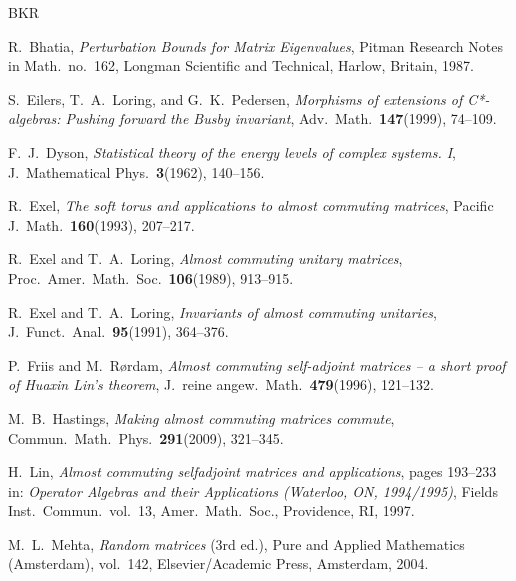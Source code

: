 \documentclass[10pt]{amsart}
\theoremstyle{definition}
\begin{document}
\begin{thebibliography}{BKR}

 R.~Bhatia,
{\emph{Perturbation Bounds for Matrix Eigenvalues}},
Pitman Research Notes in Math.\  no.~162,
Longman Scientific and Technical, Harlow, Britain, 1987.

S.~Eilers, T.~A.\  Loring, and G.~K.\  Pedersen,
{\emph{Morphisms of extensions of C*-algebras: Pushing forward the Busby
        invariant}},
Adv.\  Math.\   {\textbf{147}}(1999), 74--109.

 F.~J.\  Dyson,
{\emph{Statistical theory of the energy levels of complex systems. I}},
J.~Mathematical Phys.\  {\textbf{3}}(1962), 140--156.


 R.~Exel,
{\emph{The soft torus and applications to almost commuting matrices}},
Pacific J.\  Math.\  {\textbf{160}}(1993), 207--217.

 R.~Exel and T.~A.\  Loring,
{\emph{Almost commuting unitary matrices}},
Proc.\  Amer.\  Math.\  Soc.\   {\textbf{106}}(1989),  913--915.

 R.~Exel and T.~A.\  Loring,
{\emph{Invariants of almost commuting unitaries}},
J.~Funct.\  Anal.\  {\textbf{95}}(1991), 364--376.

P.~Friis and M.~R{\o}rdam,
{\emph{Almost commuting self-adjoint matrices -- a short proof
  of Huaxin Lin's theorem}},
J.~reine angew.\  Math.\   {\textbf{479}}(1996), 121--132.


  M.~B.\  Hastings,
{\emph{Making almost commuting matrices commute}},
Commun.\  Math.\  Phys.\  {\textbf{291}}(2009), 321--345.

 H.~Lin,
{\emph{Almost commuting selfadjoint matrices and applications}},
pages 193--233 in:
{\emph{Operator Algebras and their Applications
(Waterloo, ON, 1994/1995)}},
Fields Inst.\  Commun.\  vol.~13,
Amer.\  Math.\  Soc., Providence, RI, 1997.

 M.~L.\  Mehta,
{\emph{Random matrices}} (3rd ed.),
Pure and Applied Mathematics (Amsterdam), vol.\  142,
Elsevier/Academic Press, Amsterdam, 2004.


\end{thebibliography}
\end{document}
